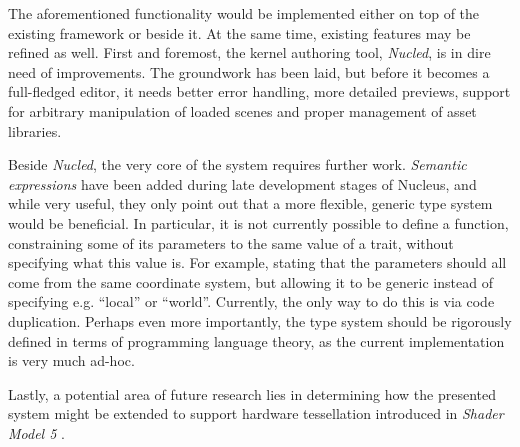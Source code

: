 The aforementioned functionality would be implemented either on top of the existing framework or beside it. At the same time, existing features may be refined as well. First and foremost, the kernel authoring tool, \emph{Nucled}, is in dire need of improvements. The groundwork has been laid, but before it becomes a full-fledged editor, it needs better error handling, more detailed previews, support for arbitrary manipulation of loaded scenes and proper management of asset libraries.

Beside \emph{Nucled}, the very core of the system requires further work. \emph{Semantic expressions} have been added during late development stages of Nucleus, and while very useful, they only point out that a more flexible, generic type system would be beneficial. In particular, it is not currently possible to define a function, constraining some of its parameters to the same value of a trait, without specifying what this value is. For example, stating that the parameters should all come from the same coordinate system, but allowing it to be generic instead of specifying e.g. ``local'' or ``world''. Currently, the only way to do this is via code duplication. Perhaps even more importantly, the type system should be rigorously defined in terms of programming language theory, as the current implementation is very much ad-hoc.

Lastly, a potential area of future research lies in determining how the presented system might be extended to support hardware tessellation introduced in \emph{Shader Model 5} \cite{SM5}.
